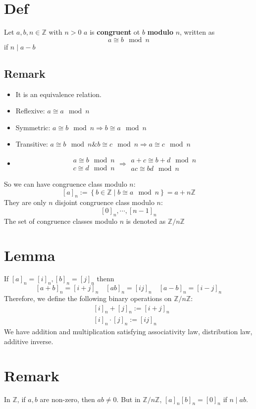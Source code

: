 \documentclass{book}
\begin{document}
\section{Def} Let $a,b,n\in \mathbb{Z}$ with $n>0$ $a$ is \textbf{congruent} ot $b$ \textbf{modulo} $n$, written as $$a\cong b\mod n$$ if $n\mid a-b$
\subsection*{Remark}
\begin{itemize}
	\item It is an equivalence relation.
	\item Reflexive: $a\cong a\mod n$
	\item Symmetric: $a\cong b\mod n\Rightarrow b\cong a\mod n$
	\item Transitive: $a\cong b\mod n\& b\cong c\mod n\Rightarrow a\cong c\mod n$
	\item $$\begin{aligned}
		a\cong b\mod n\\c\cong d\mod n
	\end{aligned}\Rightarrow\begin{aligned}
		a+c\cong b+d\mod n\\ac\cong bd\mod n
	\end{aligned}$$
\end{itemize}

So we can have congruence class modulo $n$:
$$[a]_n:=\left\{b\in \mathbb{Z}\mid b\cong a\mod n\right\}=a+n\mathbb{Z}$$
They are only $n$ disjoint congruence class modulo $n$:
$$[0]_n,\cdots, [n-1]_n$$
The set of congruence classes modulo $n$ is denoted as $\mathbb{Z}/n\mathbb{Z}$
\section{Lemma}
If $[a]_n=[i]_n,[b]_n=[j]_n$ thenn $$[a+b]_n=[i+j]_n\quad [ab]_n=[ij]_n\quad [a-b]_n=[i-j]_n$$
Therefore, we define the following binary operations on $\mathbb{Z}/n\mathbb{Z}$:
$$
\begin{aligned}
	&[i]_n+[j]_n:=[i+j]_n\\
	&[i]_n\cdot[j]_n:=[ij]_n
\end{aligned}
$$
We have addition and multiplication satisfying associativity law, distribution law, additive inverse.
\section{Remark}
In $\mathbb{Z}$, if $a,b$ are non-zero, then $ab\neq 0$. But in $\mathbb{Z}/n\mathbb{Z}$, $[a]_n[b]_n=[0]_n$ if $n\mid ab$.
\end{document}
